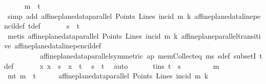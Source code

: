 \begin{isabellebody}
\ \ \ \ \isamarkupfalse%
\ {\isachardoublequoteopen}m\ {\isasymin}\ t{\isachardoublequoteclose}\ \ \isamarkupfalse%
\ {\isacharparenleft}{\kern0pt}simp\ add{\isacharcolon}{\kern0pt}\ {\isacartoucheopen}affine{\isacharunderscore}{\kern0pt}plane{\isacharunderscore}{\kern0pt}data{\isachardot}{\kern0pt}parallel\ Points\ Lines\ incid\ m\ k{\isacartoucheclose}\ affine{\isacharunderscore}{\kern0pt}plane{\isacharunderscore}{\kern0pt}data{\isachardot}{\kern0pt}line{\isacharunderscore}{\kern0pt}pencil{\isacharunderscore}{\kern0pt}def\ tdef{\isacharparenright}{\kern0pt}\isanewline
\ \ \ \ \isamarkupfalse%
\ \ {\isachardoublequoteopen}s\ {\isasymsubseteq}\ t{\isachardoublequoteclose}\isanewline
\ \ \ \ \ \ \isamarkupfalse%
\ {\isacharparenleft}{\kern0pt}metis\ {\isacartoucheopen}affine{\isacharunderscore}{\kern0pt}plane{\isacharunderscore}{\kern0pt}data{\isachardot}{\kern0pt}parallel\ Points\ Lines\ incid\ m\ k{\isacartoucheclose}\ affine{\isacharunderscore}{\kern0pt}plane{\isachardot}{\kern0pt}parallel{\isacharunderscore}{\kern0pt}transitive{}\ affine{\isacharunderscore}{\kern0pt}plane{\isacharunderscore}{\kern0pt}data{\isachardot}{\kern0pt}line{\isacharunderscore}{\kern0pt}pencil{\isacharunderscore}{\kern0pt}def\isanewline
\ \ \ \ \ \ \ \ \ \ affine{\isacharunderscore}{\kern0pt}plane{\isacharunderscore}{\kern0pt}data{\isachardot}{\kern0pt}parallel{\isacharunderscore}{\kern0pt}symmetric\ ap\ mem{\isacharunderscore}{\kern0pt}Collect{\isacharunderscore}{\kern0pt}eq\ ms\ sdef\ subsetI\ tdef{\isacharparenright}{\kern0pt}\isanewline
\ \ \ \ \isamarkupfalse%
\ {\isachardoublequoteopen}\ {\isasymAnd}x{\isachardot}{\kern0pt}\ x\ {\isasymin}\ s\ {\isasymLongrightarrow}\ x\ {\isasymin}\ t{\isachardoublequoteclose}\ \isamarkupfalse%
\ {\isacartoucheopen}s\ {\isasymsubseteq}\ t{\isacartoucheclose}\ \isamarkupfalse%
\ auto\isanewline
\ \ \isamarkupfalse%
\isanewline
\ \ \isamarkupfalse%
\ t{\isacharunderscore}{\kern0pt}in{\isacharunderscore}{\kern0pt}s{\isacharcolon}{\kern0pt}\ {\isachardoublequoteopen}t\ {\isasymsubseteq}\ s{\isachardoublequoteclose}\isanewline
\ \ \isamarkupfalse%
\isanewline
\ \ \ \ \isamarkupfalse%
\ m\isanewline
\ \ \ \ \isamarkupfalse%
\ mt{\isacharcolon}{\kern0pt}\ {\isachardoublequoteopen}m\ {\isasymin}\ t{\isachardoublequoteclose}\isanewline
\ \ \ \ \isamarkupfalse%
\ {\isachardoublequoteopen}affine{\isacharunderscore}{\kern0pt}plane{\isacharunderscore}{\kern0pt}data{\isachardot}{\kern0pt}parallel\ Points\ Lines\ {\isacharparenleft}{\kern0pt}incid{\isacharparenright}{\kern0pt}\ m\ k{\isachardoublequoteclose}\ \isanewline

\end{isabellebody}
